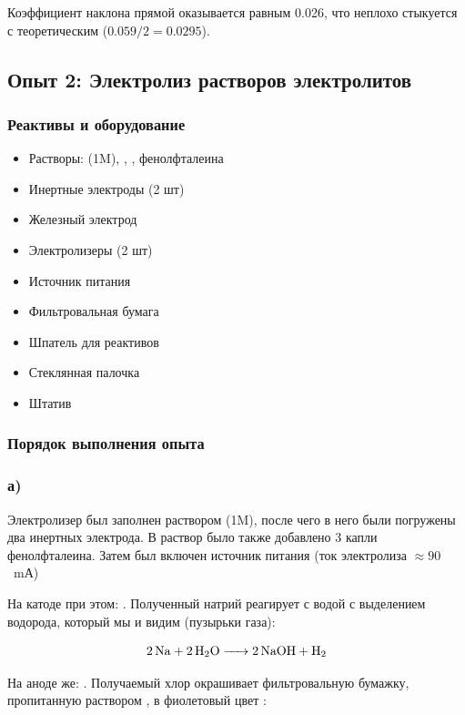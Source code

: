 \documentclass[a4paper, 12pt]{article}
\begin{document}
Коэффициент наклона прямой оказывается равным 0.026, что неплохо стыкуется с теоретическим ($0.059 / 2 = 0.0295$).

\subsection{Опыт 2: Электролиз растворов электролитов}

\subsubsection{Реактивы и оборудование}

\begin{itemize}
	\item Растворы:  (1M), , , фенолфталеина
	
	\item Инертные электроды (2 шт)
	\item Железный электрод
	\item Электролизеры (2 шт)
	\item Источник питания
	\item Фильтровальная бумага
	\item Шпатель для реактивов
	\item Стеклянная палочка
	\item Штатив
\end{itemize}

\subsubsection{Порядок выполнения опыта}

\subsubsection*{а)}

Электролизер был заполнен раствором  (1M), после чего в него были погружены два инертных электрода. В раствор было также добавлено 3 капли фенолфталеина. Затем был включен источник питания (ток электролиза $\approx 90$~mА)

На катоде при этом: . Полученный натрий реагирует с водой с выделением водорода, который мы и видим (пузырьки газа):

\begin{equation}
	\ce{2Na + 2H2O -> 2NaOH + H2}
\end{equation}

На аноде же: . Получаемый хлор окрашивает фильтровальную бумажку, пропитанную раствором , в фиолетовый цвет :
\end{document}
